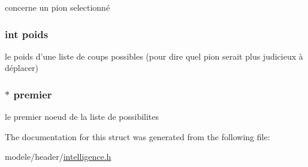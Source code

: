 concerne un pion selectionné 

\hypertarget{struct_liste_possibilites_ac1abe8fa63a4167cf11ef707f524f0c4}{
\subsubsection[{poids}]{\setlength{\rightskip}{0pt plus 5cm}int poids}}\label{struct_liste_possibilites_ac1abe8fa63a4167cf11ef707f524f0c4}


le poids d'une liste de coups possibles (pour dire quel pion serait plus judicieux à déplacer) 

\hypertarget{struct_liste_possibilites_a9887300a868bffa9377c72541e175906}{
\subsubsection[{premier}]{$\ast$ premier}}\label{struct_liste_possibilites_a9887300a868bffa9377c72541e175906}


le premier noeud de la liste de possibilites 



The documentation for this struct was generated from the following file\-:\begin{DoxyCompactItemize}
\item 
modele/header/\hyperlink{intelligence_8h}{intelligence.\-h}\end{DoxyCompactItemize}

